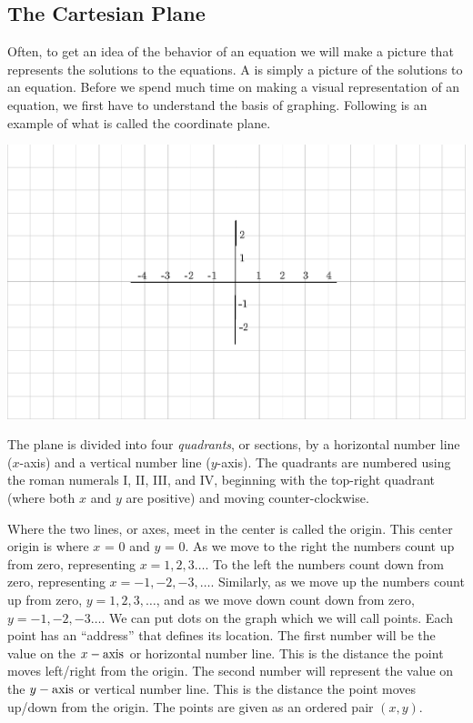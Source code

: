 \subsection{The Cartesian Plane}\pp

 {}\pp

 Often, to get an idea of the behavior of an equation we will make a picture
that represents the solutions to the equations. A {} is simply
a picture of the solutions to an equation. Before we spend much time on making
a visual representation of an equation, we first have to understand the basis
of graphing. Following is an example of what is called the coordinate plane.

\begin{multicols}{2}
  \includegraphics[scale=.9,bb = 115 65 310 190, clip=true]{II_1_3b-1.eps}
  
  
  The plane is divided into four \textit{quadrants}, or sections, by a horizontal number line
  ($x$-axis) and a vertical number line ($y$-axis). The quadrants are numbered using the roman numerals I, II, III, and IV, beginning with the top-right quadrant (where both $x$ and $y$ are positive) and moving counter-clockwise.
\end{multicols}

 Where the two lines, or axes, meet
  in the center is called the origin. This center origin is where $x$ = 0 and $y$ = 0.\pp
	As we move to the right the numbers count up from zero,
  representing $x = 1, 2, 3 \ldots$. To the left the numbers count down from zero, representing \mbox{$x = - 1, - 2, - 3,\ldots$}.
 Similarly, as we move up the numbers count up from zero, \mbox{$y = 1, 2, 3,\ldots$}, and as we move down count down from zero, \mbox{$y = - 1, - 2, - 3\ldots$}.\pp
We can put dots on the graph which we will call points. Each point has an
``address'' that defines its location. The first number will be the value on
the $x - \operatorname{axis}$ or horizontal number line. This is the distance the
point moves left/right from the origin. The second number will represent the
value on the $y - \operatorname{axis}$ or vertical number line. This is the distance
the point moves up/down from the origin. The points are given as an ordered
pair $(x, y) .$\pp

